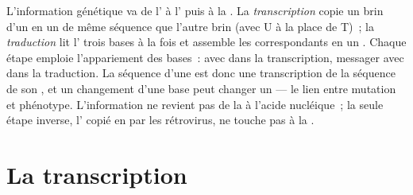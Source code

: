 \begin{proposition}\label{prop:b1:gene-expression:dogma}
L'information génétique va de l' à l' puis à la . La
\emph{transcription} copie un brin d'un  en un  de même séquence
que l'autre brin (avec U à la place de T)~; la \emph{traduction} lit
l' trois bases à la fois et assemble les 
correspondants en un . Chaque étape emploie l'appariement des
bases~:  avec  dans la transcription, messager avec  dans la traduction. La séquence d'une  est donc une
transcription de la séquence de son , et un changement d'une base
peut changer un  --- le lien entre mutation et phénotype.
L'information ne revient pas de la  à l'acide nucléique~; la
seule étape inverse, l' copié en  par les rétrovirus, ne touche
pas à la .
\end{proposition}

\section{La transcription}

